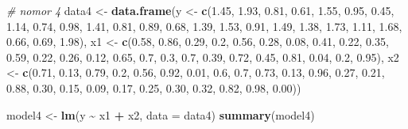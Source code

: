 \documentclass[
]{article}
\newenvironment{Shaded}{\begin{snugshade}}{\end{snugshade}}
\newcommand{\AttributeTok}[1]{\textcolor[rgb]{0.13,0.29,0.53}{#1}}
\newcommand{\CommentTok}[1]{\textcolor[rgb]{0.56,0.35,0.01}{\textit{#1}}}
\newcommand{\FloatTok}[1]{\textcolor[rgb]{0.00,0.00,0.81}{#1}}
\newcommand{\FunctionTok}[1]{\textcolor[rgb]{0.13,0.29,0.53}{\textbf{#1}}}
\newcommand{\NormalTok}[1]{#1}
\newcommand{\OtherTok}[1]{\textcolor[rgb]{0.56,0.35,0.01}{#1}}
\newcommand{\SpecialCharTok}[1]{\textcolor[rgb]{0.81,0.36,0.00}{\textbf{#1}}}
\begin{document}
\begin{Shaded}
\begin{Highlighting}[]
\CommentTok{\# nomor 4}
\NormalTok{data4 }\OtherTok{\textless{}{-}} \FunctionTok{data.frame}\NormalTok{(y }\OtherTok{\textless{}{-}} \FunctionTok{c}\NormalTok{(}\FloatTok{1.45}\NormalTok{, }\FloatTok{1.93}\NormalTok{, }\FloatTok{0.81}\NormalTok{, }\FloatTok{0.61}\NormalTok{, }\FloatTok{1.55}\NormalTok{, }\FloatTok{0.95}\NormalTok{, }\FloatTok{0.45}\NormalTok{, }\FloatTok{1.14}\NormalTok{, }\FloatTok{0.74}\NormalTok{, }\FloatTok{0.98}\NormalTok{, }\FloatTok{1.41}\NormalTok{, }\FloatTok{0.81}\NormalTok{, }\FloatTok{0.89}\NormalTok{, }\FloatTok{0.68}\NormalTok{, }\FloatTok{1.39}\NormalTok{, }\FloatTok{1.53}\NormalTok{, }\FloatTok{0.91}\NormalTok{, }\FloatTok{1.49}\NormalTok{, }\FloatTok{1.38}\NormalTok{, }\FloatTok{1.73}\NormalTok{, }\FloatTok{1.11}\NormalTok{, }\FloatTok{1.68}\NormalTok{, }\FloatTok{0.66}\NormalTok{, }\FloatTok{0.69}\NormalTok{, }\FloatTok{1.98}\NormalTok{),}
\NormalTok{                    x1 }\OtherTok{\textless{}{-}} \FunctionTok{c}\NormalTok{(}\FloatTok{0.58}\NormalTok{, }\FloatTok{0.86}\NormalTok{, }\FloatTok{0.29}\NormalTok{, }\FloatTok{0.2}\NormalTok{, }\FloatTok{0.56}\NormalTok{, }\FloatTok{0.28}\NormalTok{, }\FloatTok{0.08}\NormalTok{, }\FloatTok{0.41}\NormalTok{, }\FloatTok{0.22}\NormalTok{, }\FloatTok{0.35}\NormalTok{, }\FloatTok{0.59}\NormalTok{, }\FloatTok{0.22}\NormalTok{, }\FloatTok{0.26}\NormalTok{, }\FloatTok{0.12}\NormalTok{, }\FloatTok{0.65}\NormalTok{, }\FloatTok{0.7}\NormalTok{, }\FloatTok{0.3}\NormalTok{, }\FloatTok{0.7}\NormalTok{, }\FloatTok{0.39}\NormalTok{, }\FloatTok{0.72}\NormalTok{, }\FloatTok{0.45}\NormalTok{, }\FloatTok{0.81}\NormalTok{, }\FloatTok{0.04}\NormalTok{, }\FloatTok{0.2}\NormalTok{, }\FloatTok{0.95}\NormalTok{),}
\NormalTok{                    x2 }\OtherTok{\textless{}{-}} \FunctionTok{c}\NormalTok{(}\FloatTok{0.71}\NormalTok{, }\FloatTok{0.13}\NormalTok{, }\FloatTok{0.79}\NormalTok{, }\FloatTok{0.2}\NormalTok{, }\FloatTok{0.56}\NormalTok{, }\FloatTok{0.92}\NormalTok{, }\FloatTok{0.01}\NormalTok{, }\FloatTok{0.6}\NormalTok{, }\FloatTok{0.7}\NormalTok{, }\FloatTok{0.73}\NormalTok{, }\FloatTok{0.13}\NormalTok{, }\FloatTok{0.96}\NormalTok{, }\FloatTok{0.27}\NormalTok{, }\FloatTok{0.21}\NormalTok{, }\FloatTok{0.88}\NormalTok{, }\FloatTok{0.30}\NormalTok{, }\FloatTok{0.15}\NormalTok{, }\FloatTok{0.09}\NormalTok{, }\FloatTok{0.17}\NormalTok{, }\FloatTok{0.25}\NormalTok{, }\FloatTok{0.30}\NormalTok{, }\FloatTok{0.32}\NormalTok{, }\FloatTok{0.82}\NormalTok{, }\FloatTok{0.98}\NormalTok{, }\FloatTok{0.00}\NormalTok{))}

\NormalTok{model4 }\OtherTok{\textless{}{-}} \FunctionTok{lm}\NormalTok{(y }\SpecialCharTok{\textasciitilde{}}\NormalTok{ x1 }\SpecialCharTok{+}\NormalTok{ x2, }\AttributeTok{data =}\NormalTok{ data4)}
\FunctionTok{summary}\NormalTok{(model4)}
\end{Highlighting}
\end{Shaded}
\end{document}
